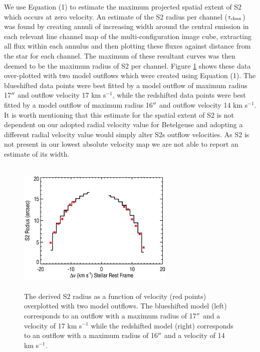 \documentclass[iop]{emulateapj}
\begin{document}
We use Equation (1) to estimate the maximum projected spatial extent of S2 which occurs at zero velocity. An estimate of the S2 radius per channel ($\rm{r_{chan}}$) was found by creating annuli of increasing width around the central emission in each relevant line channel map of the multi-configuration image cube, extracting all flux within each annulus and then plotting these fluxes against distance from the star for each channel. The maximum of these resultant curves was then deemed to be the maximum radius of S2 per channel. Figure \ref{fig:fig5} shows these data over-plotted with two model outflows which were created using Equation (1). The blueshifted data points were best fitted by a model outflow of maximum radius 17$\mbox{$^{\prime\prime}$}$ and outflow velocity 17 km s${}^{-1}$, while the redshifted data points were best fitted by a model outflow of maximum radius 16$\mbox{$^{\prime\prime}$}$ and outflow velocity 14 km s${}^{-1}$. It is worth mentioning that this estimate for the spatial extent of S2 is not dependent on our adopted radial velocity value for Betelgeuse and adopting a different radial velocity value would simply alter S2s outflow velocities. As S2 is not present in our lowest absolute velocity map we are not able to report an estimate of its width.

\begin{figure}
\includegraphics[trim=45pt 0pt 80pt 10pt, width=7.5cm, height=6.5cm]{f13.eps}
\caption{The derived S2 radius as a function of velocity (red points) overplotted with two model outflows. The blueshifted model (left) corresponds to an outflow with a maximum radius of 17$\mbox{$^{\prime\prime}$}$ and a velocity of 17 km s${}^{-1}$ while the redshifted model (right) corresponds to an outflow with a maximum radius of 16$\mbox{$^{\prime\prime}$}$ and a velocity of 14 km s${}^{-1}$.}
\label{fig:fig5}
\end{figure}
\end{document}
